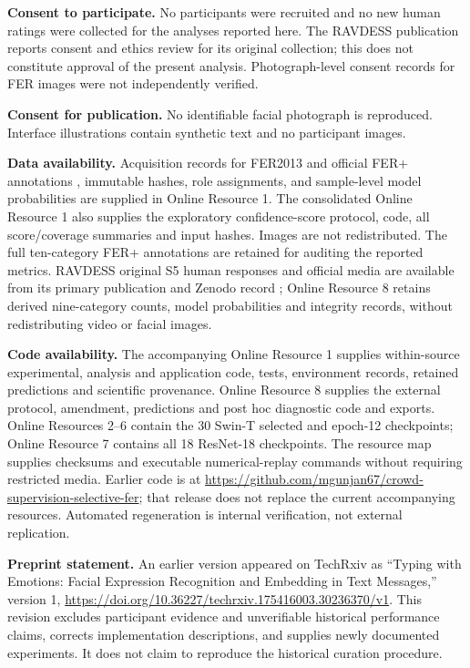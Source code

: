 \documentclass[pdflatex,sn-mathphys-num]{sn-jnl}
\begin{document}
\noindent\textbf{Consent to participate.} No participants were recruited and no new human ratings were collected for the analyses reported here. The RAVDESS publication reports consent and ethics review for its original collection; this does not constitute approval of the present analysis. Photograph-level consent records for FER images were not independently verified.

\noindent\textbf{Consent for publication.} No identifiable facial photograph is reproduced. Interface illustrations contain synthetic text and no participant images.

\noindent\textbf{Data availability.} Acquisition records for FER2013 \cite{goodfellow2013fer} and official FER+ annotations \cite{barsoum2016ferplus}, immutable hashes, role assignments, and sample-level model probabilities are supplied in Online Resource 1. The consolidated Online Resource 1 also supplies the exploratory confidence-score protocol, code, all score/coverage summaries and input hashes. Images are not redistributed. The full ten-category FER+ annotations are retained for auditing the reported metrics. RAVDESS original S5 human responses and official media are available from its primary publication and Zenodo record \cite{livingstone2018ravdess}; Online Resource 8 retains derived nine-category counts, model probabilities and integrity records, without redistributing video or facial images.

\noindent\textbf{Code availability.} The accompanying Online Resource 1 supplies within-source experimental, analysis and application code, tests, environment records, retained predictions and scientific provenance. Online Resource 8 supplies the external protocol, amendment, predictions and post hoc diagnostic code and exports. Online Resources 2--6 contain the 30 Swin-T selected and epoch-12 checkpoints; Online Resource 7 contains all 18 ResNet-18 checkpoints. The resource map supplies checksums and executable numerical-replay commands without requiring restricted media. Earlier code is at \url{https://github.com/mgunjan67/crowd-supervision-selective-fer}; that release does not replace the current accompanying resources. Automated regeneration is internal verification, not external replication.

\noindent\textbf{Preprint statement.} An earlier version appeared on TechRxiv as ``Typing with Emotions: Facial Expression Recognition and Embedding in Text Messages,'' version 1, \url{https://doi.org/10.36227/techrxiv.175416003.30236370/v1}. This revision excludes participant evidence and unverifiable historical performance claims, corrects implementation descriptions, and supplies newly documented experiments. It does not claim to reproduce the historical curation procedure.
\end{document}
